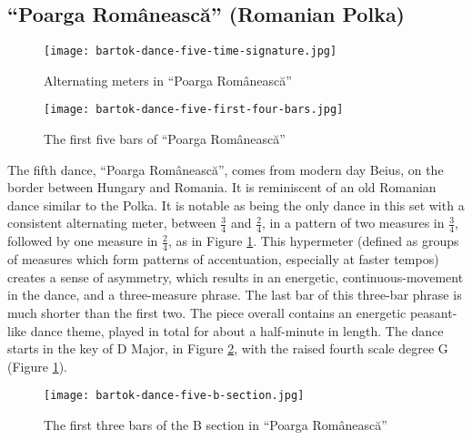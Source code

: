 \subsection{``Poarga Românească'' (Romanian Polka)}

\begin{figure}
  \centering
  \texttt{[image: bartok-dance-five-time-signature.jpg]}
  \caption[The alternating meters in ``Poarga Românească'' of Bartok's \textit{Romanian Folk Dances, Sz. 56, BB 68}]{Alternating meters in ``Poarga Românească''}
  \label{fig:bartok-dance-five-time-signature}
\end{figure}

\begin{figure}
  \centering
  \texttt{[image: bartok-dance-five-first-four-bars.jpg]}
  \caption[The first five bars of ``Poarga Românească'', of Bartok's \textit{Romanian Folk Dances, Sz. 56, BB 68}]{The first five bars of ``Poarga Românească''}
  \label{fig:bartok-dance-five-first-four-bars}
\end{figure}


The fifth dance, ``Poarga Românească'', comes from modern day Beius, on the border between Hungary and Romania. It is reminiscent of an old Romanian dance similar to the Polka. It is notable as being the only dance in this set with a consistent alternating meter, between $\frac{3}{4}$ and $\frac{2}{4}$, in a pattern of two measures in $\frac{3}{4}$, followed by one measure in $\frac{2}{4}$, as in Figure \ref{fig:bartok-dance-five-time-signature}\autocite{Lung_2016}. This hypermeter (defined as groups of measures which form patterns of accentuation, especially at faster tempos\autocite{Hughes_Gotham_Hamm_2021}) creates a sense of asymmetry, which results in an energetic, continuous-movement in the dance, and a three-measure phrase. The last bar of this three-bar phrase is much shorter than the first two. The piece overall contains an energetic peasant-like dance theme, played in total for about a half-minute in length. The dance starts in the key of D Major, in Figure \ref{fig:bartok-dance-five-first-four-bars}\autocite{Lung_2016}, with the raised fourth scale degree G\musSharp{} (Figure \ref{fig:bartok-dance-five-time-signature}\autocite{Lung_2016}).

\begin{figure}
  \centering
  \texttt{[image: bartok-dance-five-b-section.jpg]}
  \caption[The first three bars in the B section of ``Poarga Românească'' in Bartok's \textit{Romanian Folk Dances, Sz. 56, BB 68}]{The first three bars of the B section in ``Poarga Românească''}
  \label{fig:bartok-dance-five-b-section}
\end{figure}

